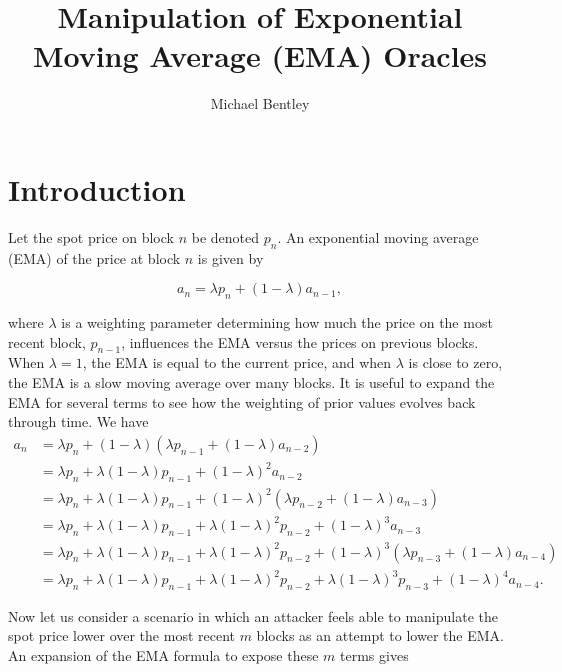 \documentclass[bibliography=numbered]{article}
\title{Manipulation of Exponential Moving Average (EMA) Oracles}
\author{Michael Bentley}
\begin{document}
\maketitle

\section{Introduction}

Let the spot price on block $n$ be denoted $p_n$. An exponential moving average (EMA) of the price at block $n$ is given by

\begin{equation}
    a_{n} 
    =
    \lambda p_{n} + (1 - \lambda) a_{n - 1},
\end{equation}

where $\lambda$ is a weighting parameter determining how much the price on the most recent block, $p_{n - 1}$, influences the EMA versus the prices on previous blocks. When $\lambda = 1$, the EMA is equal to the current price, and when $\lambda$ is close to zero, the EMA is a slow moving average over many blocks. It is useful to expand the EMA for several terms to see how the weighting of prior values evolves back through time. We have
\begin{align}
    a_{n} 
    &=
    \lambda p_{n} + (1 - \lambda) (\lambda p_{n - 1} + (1 - \lambda) a_{n - 2}) \\ \nonumber
    &=
    \lambda p_{n} + \lambda (1 - \lambda) p_{n - 1} + (1 - \lambda)^2 a_{n - 2} \\ \nonumber
    &=
    \lambda p_{n} + \lambda (1 - \lambda) p_{n - 1} + (1 - \lambda)^2 (\lambda p_{n - 2} + (1 - \lambda) a_{n - 3}) \\ \nonumber
    &=
    \lambda p_{n} + \lambda (1 - \lambda) p_{n - 1} + \lambda (1 - \lambda)^2 p_{n - 2} + (1 - \lambda)^3 a_{n - 3} \\ \nonumber
    &=
    \lambda p_{n} + \lambda (1 - \lambda) p_{n - 1} + \lambda (1 - \lambda)^2 p_{n - 2} + (1 - \lambda)^3 (\lambda p_{n - 3} + (1 - \lambda) a_{n - 4}) \\ \nonumber
    &=
    \lambda p_{n} + \lambda (1 - \lambda) p_{n - 1} + \lambda (1 - \lambda)^2 p_{n - 2} + \lambda (1 - \lambda)^3  p_{n - 3} + (1 - \lambda)^4 a_{n - 4}.
\end{align}

Now let us consider a scenario in which an attacker feels able to manipulate the spot price lower over the most recent $m$ blocks as an attempt to lower the EMA. An expansion of the EMA formula to expose these $m$ terms gives
\end{document}
